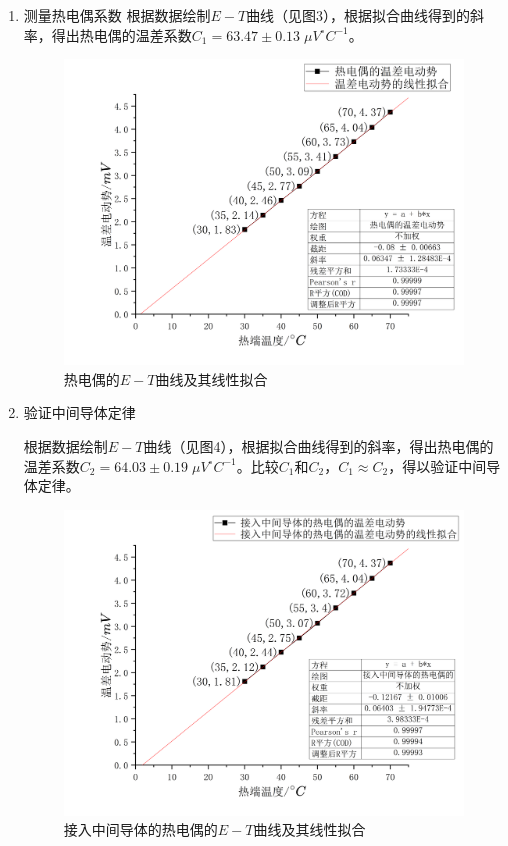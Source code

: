 \documentclass[11pt]{article}
\begin{document}
\begin{enumerate}
    \item 测量热电偶系数
    根据数据绘制$E-T$曲线（见图3），根据拟合曲线得到的斜率，得出热电偶的温差系数$C_1=63.47\pm0.13\;\mu V^{\circ}C^{-1}$。
    
    \begin{figure}[H]
        \centering
        \includegraphics[width=13.5cm]{Figs/Graph1.png}
        \caption{\normalsize 热电偶的$E-T$曲线及其线性拟合}
    \end{figure}

    \item 验证中间导体定律
    
    根据数据绘制$E-T$曲线（见图4），根据拟合曲线得到的斜率，得出热电偶的温差系数$C_2=64.03\pm0.19\;\mu V^{\circ}C^{-1}$。比较$C_1$和$C_2$，$C_1\approx C_2$，得以验证中间导体定律。
    
    \begin{figure}[H]
        \centering
        \includegraphics[width=13.5cm]{Figs/Graph2.png}
        \caption{\normalsize 接入中间导体的热电偶的$E-T$曲线及其线性拟合}
    \end{figure}


\end{enumerate}
\end{document}
